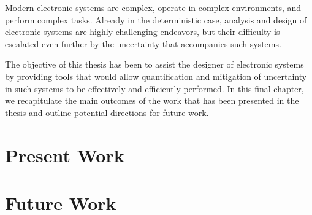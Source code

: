 Modern electronic systems are complex, operate in complex environments, and
perform complex tasks. Already in the deterministic case, analysis and design of
electronic systems are highly challenging endeavors, but their difficulty is
escalated even further by the uncertainty that accompanies such systems.

The objective of this thesis has been to assist the designer of electronic
systems by providing tools that would allow quantification and mitigation of
uncertainty in such systems to be effectively and efficiently performed. In this
final chapter, we recapitulate the main outcomes of the work that has been
presented in the thesis and outline potential directions for future work.

\section{Present Work}

\section{Future Work}
